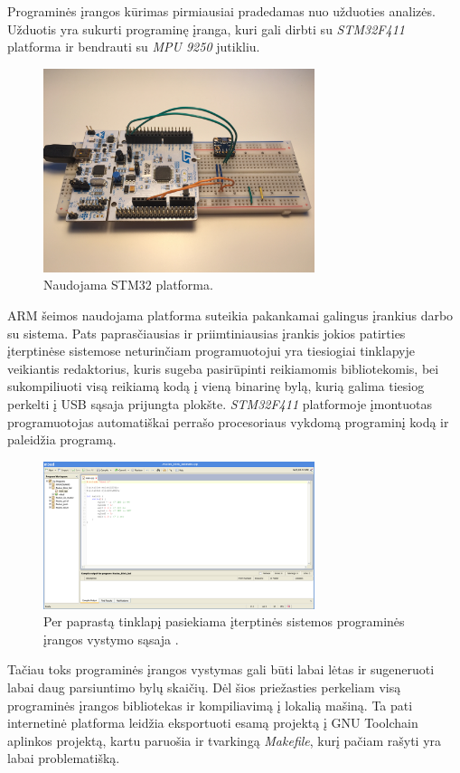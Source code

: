 Programinės įrangos kūrimas pirmiausiai pradedamas nuo užduoties analizės.
Užduotis yra sukurti programinę įranga, kuri gali dirbti su \textit{STM32F411} platforma ir bendrauti su \textit{MPU 9250} jutikliu.

\begin{figure}[H]
    \centering
    \includegraphics[width=300px]{img/naudojama-platforma.jpg}
    \caption{Naudojama STM32 platforma.}
    \label{fig:web-idea}
\end{figure}

ARM šeimos naudojama platforma suteikia pakankamai galingus įrankius darbo su sistema. Pats paprasčiausias ir priimtiniausias įrankis jokios patirties įterptinėse sistemose neturinčiam programuotojui yra tiesiogiai tinklapyje veikiantis redaktorius, kuris sugeba pasirūpinti reikiamomis bibliotekomis, bei sukompiliuoti visą reikiamą kodą į vieną binarinę bylą, kurią galima tiesiog perkelti į USB sąsaja prijungta plokšte. \textit{STM32F411} platformoje įmontuotas programuotojas automatiškai perrašo procesoriaus vykdomą programinį kodą ir paleidžia programą.

\begin{figure}[H]
    \centering
    \includegraphics[width=300px]{img/web-idea.png}
    \caption{Per paprastą tinklapį pasiekiama įterptinės sistemos programinės įrangos vystymo sąsaja \cite{mbedC9:online}.}
    \label{fig:web-idea}
\end{figure}

Tačiau toks programinės įrangos vystymas gali būti labai lėtas ir sugeneruoti labai daug parsiuntimo bylų skaičių. 
Dėl šios priežasties perkeliam visą programinės įrangos bibliotekas ir kompiliavimą į lokalią mašiną.
Ta pati internetinė platforma leidžia eksportuoti esamą projektą į GNU Toolchain aplinkos projektą, kartu paruošia ir tvarkingą \textit{Makefile}, kurį pačiam rašyti yra labai problematišką.

